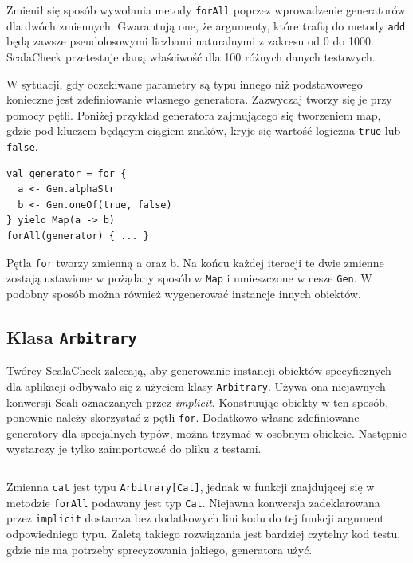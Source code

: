 \documentclass[brudnopis]{xmgr}
\begin{document}
\inputminted[fontsize=\small]{scala}{code/CalcTestOk.scala}

Zmienił się sposób wywołania metody \texttt{forAll} poprzez wprowadzenie generatorów dla dwóch zmiennych. Gwarantują one, że argumenty, które trafią do metody \texttt{add} będą zawsze pseudolosowymi liczbami naturalnymi z zakresu od 0 do 1000. ScalaCheck przetestuje daną właściwość dla 100 różnych danych testowych. 

W sytuacji, gdy oczekiwane parametry są typu innego niż podstawowego konieczne jest zdefiniowanie własnego generatora. Zazwyczaj tworzy się je przy pomocy pętli. Poniżej przykład generatora zajmującego się tworzeniem map, gdzie pod kluczem będącym ciągiem znaków, kryje się wartość logiczna \texttt{true} lub \texttt{false}.

\begin{verbatim}
val generator = for {
  a <- Gen.alphaStr  
  b <- Gen.oneOf(true, false)
} yield Map(a -> b)
forAll(generator) { ... }
\end{verbatim}

Pętla \texttt{for} tworzy zmienną a oraz b. Na końcu każdej iteracji te dwie zmienne zostają ustawione w pożądany sposób w \texttt{Map} i umieszczone w cesze \texttt{Gen}. W podobny sposób można również wygenerować instancje innych obiektów. 

\subsection{Klasa \texttt{Arbitrary}}

Twórcy ScalaCheck zalecają, aby generowanie instancji obiektów specyficznych dla aplikacji odbywało się z użyciem klasy \texttt{Arbitrary}. Używa ona niejawnych konwersji Scali oznaczanych przez \emph{implicit}. Konstruując obiekty w ten sposób, ponownie należy skorzystać z pętli \texttt{for}. Dodatkowo własne zdefiniowane generatory dla specjalnych typów, można trzymać w osobnym obiekcie. Następnie wystarczy je tylko zaimportować do pliku z testami.

\inputminted[fontsize=\small]{scala}{code/CatTestArbitrary.scala}

Zmienna \texttt{cat} jest typu \texttt{Arbitrary[Cat]}, jednak w funkcji znajdującej się w metodzie \texttt{forAll} podawany jest typ \texttt{Cat}. Niejawna konwersja zadeklarowana przez \texttt{implicit} dostarcza bez dodatkowych lini kodu do tej funkcji argument odpowiedniego typu. Zaletą takiego rozwiązania jest bardziej czytelny kod testu, gdzie nie ma potrzeby sprecyzowania jakiego, generatora użyć.
\end{document}
